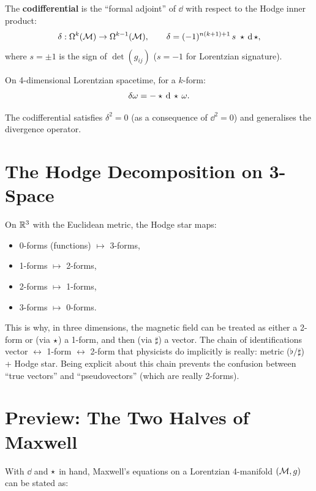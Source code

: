 \begin{definition}[Codifferential]
The \textbf{codifferential} is the ``formal adjoint'' of $\dd$ with respect to the Hodge inner product:
\begin{equation}
\delta: \Omega^k(\mathcal{M}) \to \Omega^{k-1}(\mathcal{M}), \qquad \delta = (-1)^{n(k+1)+1}\,s\;\star\,\mathrm{d}\,\star,
\end{equation}
where $s = \pm 1$ is the sign of $\det(g_{ij})$ ($s = -1$ for Lorentzian signature).
\end{definition}

On 4-dimensional Lorentzian spacetime, for a $k$-form:
\begin{equation}
\delta\omega = -\star\,\mathrm{d}\,\star\,\omega.
\end{equation}

The codifferential satisfies $\delta^2 = 0$ (as a consequence of $\dd^2 = 0$) and generalises the divergence operator.

\section{The Hodge Decomposition on 3-Space}

On $\mathbb{R}^3$ with the Euclidean metric, the Hodge star maps:
\begin{itemize}
\item 0-forms (functions) $\mapsto$ 3-forms,
\item 1-forms $\mapsto$ 2-forms,
\item 2-forms $\mapsto$ 1-forms,
\item 3-forms $\mapsto$ 0-forms.
\end{itemize}

This is why, in three dimensions, the magnetic field can be treated as either a 2-form or (via $\star$) a 1-form, and then (via $\sharp$) a vector. The chain of identifications vector $\leftrightarrow$ 1-form $\leftrightarrow$ 2-form that physicists do implicitly is really: metric ($\flat/\sharp$) + Hodge star. Being explicit about this chain prevents the confusion between ``true vectors'' and ``pseudovectors'' (which are really 2-forms).

\section{Preview: The Two Halves of Maxwell}

With $\dd$ and $\star$ in hand, Maxwell's equations on a Lorentzian 4-manifold $(\mathcal{M}, g)$ can be stated as:

